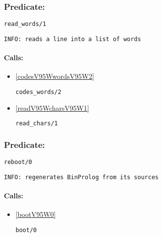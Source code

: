 \subsubsection{Predicate:} \label{readV95WwordsV95W1}

\begin{verbatim}
read_words/1
\end{verbatim}

{\small \begin{verbatim}
INFO: reads a line into a list of words

\end{verbatim}}
\paragraph{Calls:} 
\begin{itemize}
\item \ref{codesV95WwordsV95W2} 
\begin{verbatim}
codes_words/2
\end{verbatim}

\item \ref{readV95WcharsV95W1} 
\begin{verbatim}
read_chars/1
\end{verbatim}

\end{itemize}

\subsubsection{Predicate:} \label{rebootV95W0}

\begin{verbatim}
reboot/0
\end{verbatim}

{\small \begin{verbatim}
INFO: regenerates BinProlog from its sources

\end{verbatim}}
\paragraph{Calls:} 
\begin{itemize}
\item \ref{bootV95W0} 
\begin{verbatim}
boot/0
\end{verbatim}

\end{itemize}

